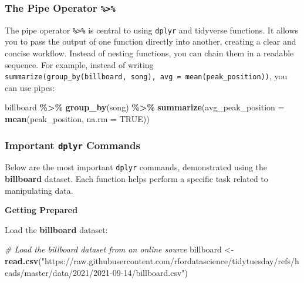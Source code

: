 \documentclass[
]{book}
\newenvironment{Shaded}{\begin{snugshade}}{\end{snugshade}}
\newcommand{\AttributeTok}[1]{\textcolor[rgb]{0.13,0.29,0.53}{#1}}
\newcommand{\CommentTok}[1]{\textcolor[rgb]{0.56,0.35,0.01}{\textit{#1}}}
\newcommand{\ConstantTok}[1]{\textcolor[rgb]{0.56,0.35,0.01}{#1}}
\newcommand{\FunctionTok}[1]{\textcolor[rgb]{0.13,0.29,0.53}{\textbf{#1}}}
\newcommand{\NormalTok}[1]{#1}
\newcommand{\OtherTok}[1]{\textcolor[rgb]{0.56,0.35,0.01}{#1}}
\newcommand{\SpecialCharTok}[1]{\textcolor[rgb]{0.81,0.36,0.00}{\textbf{#1}}}
\newcommand{\StringTok}[1]{\textcolor[rgb]{0.31,0.60,0.02}{#1}}
\begin{document}
\subsubsection*{\texorpdfstring{The Pipe Operator \texttt{\%\textgreater{}\%}}{The Pipe Operator \%\textgreater\%}}\label{the-pipe-operator}

The pipe operator \texttt{\%\textgreater{}\%} is central to using \texttt{dplyr} and tidyverse functions. It allows you to pass the output of one function directly into another, creating a clear and concise workflow. Instead of nesting functions, you can chain them in a readable sequence. For example, instead of writing \texttt{summarize(group\_by(billboard,\ song),\ avg\ =\ mean(peak\_position))}, you can use pipes:

\begin{Shaded}
\begin{Highlighting}[]
\NormalTok{billboard }\SpecialCharTok{\%\textgreater{}\%}
  \FunctionTok{group\_by}\NormalTok{(song) }\SpecialCharTok{\%\textgreater{}\%}
  \FunctionTok{summarize}\NormalTok{(}\AttributeTok{avg\_peak\_position =} \FunctionTok{mean}\NormalTok{(peak\_position, }\AttributeTok{na.rm =} \ConstantTok{TRUE}\NormalTok{))}
\end{Highlighting}
\end{Shaded}

\subsubsection*{\texorpdfstring{Important \texttt{dplyr} Commands}{Important dplyr Commands}}\label{important-dplyr-commands}

Below are the most important \texttt{dplyr} commands, demonstrated using the \textbf{billboard} dataset. Each function helps perform a specific task related to manipulating data.

\textbf{Getting Prepared}

Load the \textbf{billboard} dataset:

\begin{Shaded}
\begin{Highlighting}[]
\CommentTok{\# Load the billboard dataset from an online source}
\NormalTok{billboard }\OtherTok{\textless{}{-}} \FunctionTok{read.csv}\NormalTok{(}\StringTok{"https://raw.githubusercontent.com/rfordatascience/tidytuesday/refs/heads/master/data/2021/2021{-}09{-}14/billboard.csv"}\NormalTok{)}
\end{Highlighting}
\end{Shaded}
\end{document}
